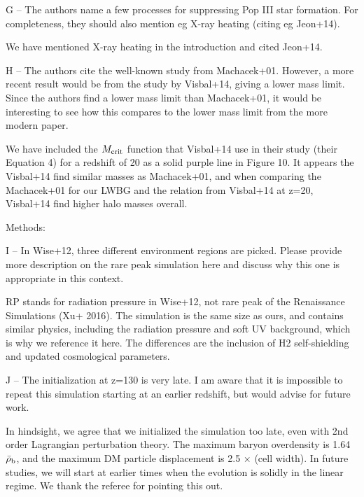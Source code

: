 \documentclass[11pt]{article}
\newenvironment{referee}[1][]{%
    \ignorespaces%
    \begin{mdframed}[style=myquotestyle,#1]%
}{%
    \end{mdframed}%
    \ignorespacesafterend%
}%
\begin{document}
\begin{referee}
G -- The authors name a few processes for suppressing Pop III star formation. For completeness, they should also mention eg X-ray heating (citing eg Jeon+14).
\end{referee}

We have mentioned X-ray heating in the introduction and cited Jeon+14.

\begin{referee}
H -- The authors cite the well-known study from Machacek+01. However, a more recent result would be from the study by Visbal+14, giving a lower mass limit. Since the authors find a lower mass limit than Machacek+01, it would be interesting to see how this compares to the lower mass limit from the more modern paper.
\end{referee}
We have included the $M_{\rm crit}$ function that Visbal+14 use in their study (their Equation 4) for a redshift of 20 as a solid purple line in Figure 10. It appears the Visbal+14 find similar masses as Machacek+01, and when comparing the Machacek+01 for our LWBG and the relation from Visbal+14 at z=20, Visbal+14 find higher halo masses overall.

\begin{referee}
Methods:

I -- In Wise+12, three different environment regions are picked. Please provide more description on the rare peak simulation here and discuss why this one is appropriate in this context.
\end{referee}


RP stands for radiation pressure in Wise+12, not rare peak of the Renaissance Simulations (Xu+ 2016). The simulation is the same size as ours, and contains similar physics, including the radiation pressure and soft UV background, which is why we reference it here. The differences are the inclusion of H2 self-shielding and updated cosmological parameters.
 
\begin{referee}
J -- The initialization at z=130 is very late. I am aware that it is impossible to repeat this simulation starting at an earlier redshift, but would advise for future work.
\end{referee}

In hindsight, we agree that we initialized the simulation too late, even with 2nd order Lagrangian perturbation theory.  The maximum baryon overdensity is 1.64$\bar{\rho}_{\rm b}$, and the maximum DM particle displacement is 2.5 $\times$ (cell width).  In future studies, we will start at earlier times when the evolution is solidly in the linear regime.  We thank the referee for pointing this out.
\end{document}
